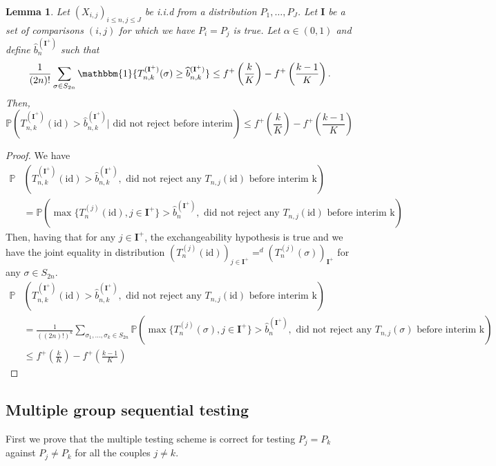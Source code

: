 \documentclass{article}
\theoremstyle{plain}
\newtheorem{Lemma}{Lemma}
\theoremstyle{remark}
\renewcommand{\P}{\mathbb{P}}
\newcommand{\1}{\mathbbm{1}}
\newcommand{\id}{\mathrm{id}}
\numberwithin{equation}{section}
\begin{document}
\begin{Lemma}
Let $(X_{i,j})_{i\le n, j\le J}$ be i.i.d from a distribution $P_1,\dots,P_J$. Let $\textbf{I}$ be a set of comparisons $(i,j)$ for which we have $P_i=P_j$ is true. Let $\alpha \in (0,1)$ and define $\widehat{b}_{n}^{(\textbf{I}^+)}$ such that 
$$ \frac{1}{(2n)!}\sum_{\sigma \in S_{2n}} \1\{T_{n,k}^{(\textbf{I}^+)}(\sigma) \ge  \widehat{b}_{n,k}^{(\textbf{I}^+)}\} \le  f^{+}\left(\frac{k}{K}\right)- f^{+}\left(\frac{k-1}{K}\right).$$
Then, 
$$\P\left(T_{n,k}^{(\textbf{I}^+)}(\id) > \widehat{b}_{n,k}^{(\textbf{I}^+)} |  \text{ did not reject before interim}\right)\le f^{+}\left(\frac{k}{K}\right)- f^{+}\left(\frac{k-1}{K}\right) $$ 
\end{Lemma}
\begin{proof}
We have
\begin{align*}
\P&\left(T_{n,k}^{(\textbf{I}^+)}(\id) > \widehat{b}_{n,k}^{(\textbf{I}^+)} ,  \text{ did not reject any $T_{n,j}(\id)$ before interim k} \right)\\
&= \P\left(\max\{T_{n}^{(j)}(\id), j \in \textbf{I}^+\} > \widehat{b}_{n}^{(\textbf{I}^+)},  \text{ did not reject any $T_{n,j}(\id)$ before interim k} \right)
\end{align*}
Then, having that for any $j \in \textbf{I}^+$, the exchangeability hypothesis is true and we have the joint equality in distribution $(T_n^{(j)}(\id))_{j \in\textbf{I}^+} =^d (T_n^{(j)}(\sigma))_{\textbf{I}^+}$ for any $\sigma \in S_{2n}$. 
\begin{align*}
\P&\left(T_{n,k}^{(\textbf{I}^+)}(\id) > \widehat{b}_{n,k}^{(\textbf{I}^+)} ,  \text{ did not reject any $T_{n,j}(\id)$ before interim k} \right)\\
&= \frac{1}{((2n)!)^k}\sum_{\sigma_1,\dots,\sigma_k \in S_{2n}}\P\left(\max\{T_{n}^{(j)}(\sigma), j \in \textbf{I}^+\} > \widehat{b}_{n}^{(\textbf{I}^+)},  \text{ did not reject any $T_{n,j}(\sigma)$ before interim k} \right)\\
&\le f^{+}\left(\frac{k}{K}\right)- f^{+}\left(\frac{k-1}{K}\right)
\end{align*}
\end{proof}
\subsection{Multiple group sequential testing}
First we prove that the multiple testing scheme is correct for testing $ P_j = P_k$ against $ P_j \neq P_k$ for all the couples $j \neq k$. 
\end{document}
